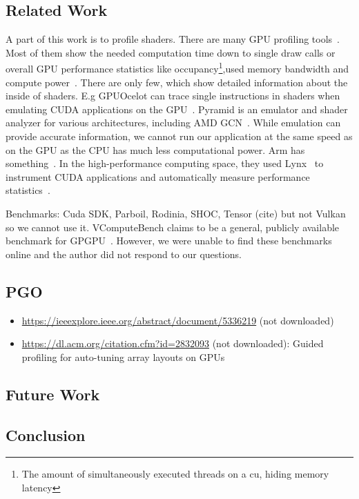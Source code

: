 \clearpage
{}
\label{sec:discussion}

\subsection{Related Work}
\label{sub:relatedwork}
A part of this work is to profile shaders. There are many GPU profiling tools~\cite{UnityGPUProfiler, UnrealGPUProfiling, MSGPUUsage, PGI2014}.
Most of them show the needed computation time down to single draw calls or overall GPU performance statistics like occupancy\footnote{The amount of simultaneously executed threads on a \gls{cu}, hiding memory latency},used memory bandwidth and compute power~\cite{NvidiaNsight, NvidiaShaderPerf, AMDShaderAnalyzer}.
There are only few, which show detailed information about the inside of shaders. E.g GPUOcelot can trace single instructions in shaders when emulating CUDA applications on the GPU~\cite{GPUOcelot, Lakshminarayana2010}. Pyramid is an emulator and shader analyzer for various architectures, including AMD GCN~\cite{Pyramid}.
While emulation can provide accurate information, we cannot run our application at the same speed as on the GPU as the CPU has much less computational power.
Arm has something~\cite{Barton2013}.
In the high-performance computing space, they used Lynx~\cite{lynx} to instrument CUDA applications and automatically measure performance statistics~\cite{Farooqui2014}.

Benchmarks: Cuda SDK, Parboil, Rodinia, SHOC, Tensor (cite) but not Vulkan so we cannot use it. VComputeBench claims to be a general, publicly available benchmark for GPGPU~\cite{Mammeri2018}. However, we were unable to find these benchmarks online and the author did not respond to our questions.

\subsection{PGO}
\begin{sloppypar}
	\begin{itemize}
		\item \url{https://ieeexplore.ieee.org/abstract/document/5336219} (not downloaded)
		\item \url{https://dl.acm.org/citation.cfm?id=2832093} (not downloaded): Guided profiling for auto-tuning array layouts on GPUs
	\end{itemize}
\end{sloppypar}

\subsection{Future Work}
\label{sub:futurework}

\subsection{Conclusion}
\label{sub:conclusion}